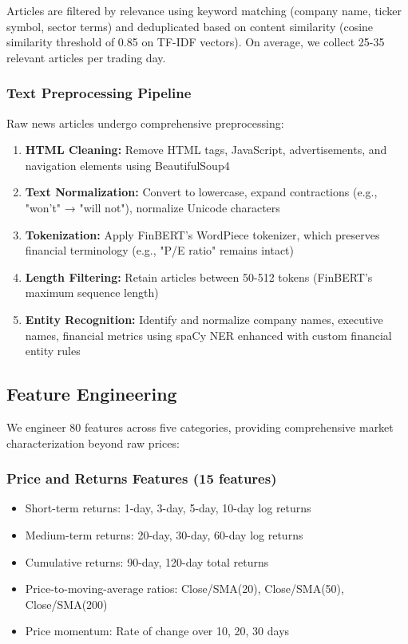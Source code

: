 \documentclass[conference]{IEEEtran}
\begin{document}
Articles are filtered by relevance using keyword matching (company name, ticker symbol, sector terms) and deduplicated based on content similarity (cosine similarity threshold of 0.85 on TF-IDF vectors). On average, we collect 25-35 relevant articles per trading day.

\subsubsection{Text Preprocessing Pipeline}
Raw news articles undergo comprehensive preprocessing:

\begin{enumerate}
\item \textbf{HTML Cleaning:} Remove HTML tags, JavaScript, advertisements, and navigation elements using BeautifulSoup4
\item \textbf{Text Normalization:} Convert to lowercase, expand contractions (e.g., "won't" → "will not"), normalize Unicode characters
\item \textbf{Tokenization:} Apply FinBERT's WordPiece tokenizer, which preserves financial terminology (e.g., "P/E ratio" remains intact)
\item \textbf{Length Filtering:} Retain articles between 50-512 tokens (FinBERT's maximum sequence length)
\item \textbf{Entity Recognition:} Identify and normalize company names, executive names, financial metrics using spaCy NER enhanced with custom financial entity rules
\end{enumerate}

\subsection{Feature Engineering}

We engineer 80 features across five categories, providing comprehensive market characterization beyond raw prices:

\subsubsection{Price and Returns Features (15 features)}
\begin{itemize}
\item Short-term returns: 1-day, 3-day, 5-day, 10-day log returns
\item Medium-term returns: 20-day, 30-day, 60-day log returns
\item Cumulative returns: 90-day, 120-day total returns
\item Price-to-moving-average ratios: Close/SMA(20), Close/SMA(50), Close/SMA(200)
\item Price momentum: Rate of change over 10, 20, 30 days
\end{itemize}
\end{document}

